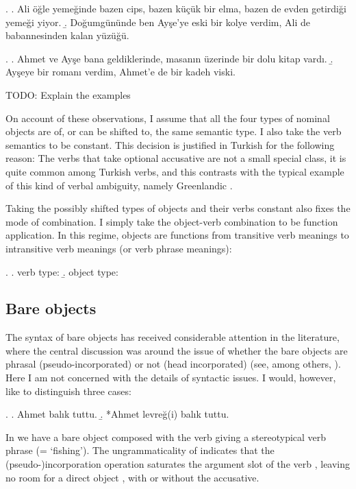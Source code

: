 \documentclass[11pt,a4paper]{article}
\begin{document}
\ex.
\a. Ali öğle yemeğinde bazen cips, bazen küçük bir elma, bazen de evden getirdiği yemeği yiyor. 
\b. Doğumgününde ben Ayşe'ye eski bir kolye verdim, Ali de babannesinden kalan yüzüğü. 

\ex.
\a. Ahmet ve Ayşe bana geldiklerinde, masanın üzerinde bir dolu kitap vardı.
\b.\label{typeell} Ayşeye bir romanı verdim, Ahmet'e de bir kadeh viski.

TODO: Explain the examples

On account of these observations, I assume that all the four types of nominal objects are of, or can be shifted to, the same semantic type. I also take the verb semantics to be constant. This decision is justified in Turkish for the following reason: The verbs that take optional accusative are not a small special class, it is quite common among Turkish verbs, and this contrasts with the typical example of this kind of verbal ambiguity, namely Greenlandic .

Taking the possibly shifted types of objects and their verbs constant also fixes the mode of combination. I simply take the object-verb combination to be function application. In this regime, objects are functions from transitive verb meanings to intransitive verb meanings (or verb phrase meanings):

\ex.
\a. verb type:  
\b. object type:  

\subsection{Bare objects}

The syntax of bare objects has received considerable attention in the literature, where the central discussion was around the issue of whether the bare objects are phrasal (pseudo-incorporated) or not (head incorporated) (see, among others, ). Here I am not concerned with the details of syntactic issues. I would, however, like to distinguish three cases:

\ex.
\label{exbalik1}
\a. Ahmet balık tuttu.
\b. *Ahmet levreğ(i) balık tuttu.

In  we have a bare object composed with the verb giving a stereotypical verb phrase (= `fishing'). The ungrammaticality of  indicates that the (pseudo-)incorporation operation saturates the argument slot of the verb , leaving no room for a direct object , with or without the accusative.
\end{document}
